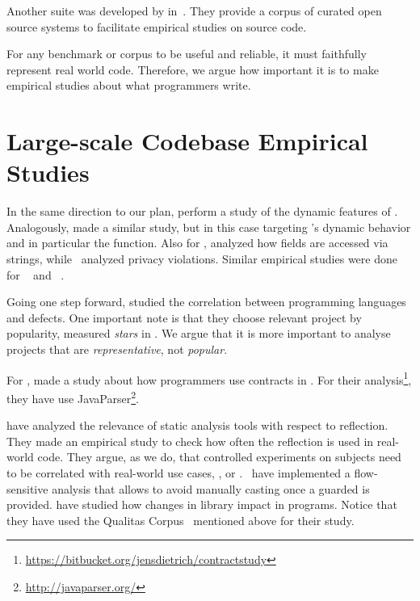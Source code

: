 Another suite was developed by in~\cite{tempero_qualitas_2010}.
They provide a corpus of curated open source systems to facilitate empirical studies on source code.

For any benchmark or corpus to be useful and reliable, it must faithfully represent real world code.
Therefore, we argue how important it is to make empirical studies about what programmers write.

\section{Large-scale Codebase Empirical Studies}
\label{sec:rw:largescale}

In the same direction to our plan, \cite{callau_how_2013} perform a study of the dynamic features of \smalltalk{}. 
Analogously, \cite{richards_analysis_2010,richards_eval_2011} made a similar study, but in this case targeting \javascript{}'s dynamic behavior and in particular the  function. 
Also for \javascript{}, \cite{madsen_string_2014} analyzed how fields are accessed via strings, while~\cite{jang_empirical_2010} analyzed privacy violations. 
Similar empirical studies were done for \php{}~\cite{hills_empirical_2013,dahse_experience_2015,doyle_empirical_2011} and \swift{}~\cite{reboucas_empirical_2016}.  

Going one step forward, \cite{ray_large-scale_2017} studied the correlation between programming languages and defects. 
One important note is that they choose relevant project by popularity, measured \emph{stars} in \github{}. 
We argue that it is more important to analyse projects that are \emph{representative}, not \emph{popular}. 

For \java{}, \cite{dietrich_contracts_2017-1} made a study about how programmers use contracts in \mavencentral{}.
For their analysis\footnote{\url{https://bitbucket.org/jensdietrich/contractstudy}}, they have use JavaParser\footnote{\url{http://javaparser.org/}}.

\cite{landman_challenges_2017} have analyzed the relevance of static analysis tools with respect to reflection. 
They made an empirical study to check how often the reflection \api{} is used in real-world code. 
They argue, as we do, that controlled experiments on subjects need to be correlated with real-world use cases, \eg{}, \github{} or \mavencentral{}. 
\cite{winther_guarded_2011} ~have implemented a flow-sensitive analysis that allows to avoid manually casting once a guarded  is provided. 
\cite{dietrich_broken_2014} have studied how changes in \api{} library impact in \java{} programs. 
Notice that they have used the Qualitas Corpus~\cite{tempero_qualitas_2010} mentioned above for their study. 

